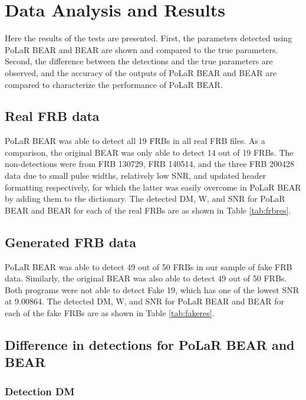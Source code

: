 \chapter{Data Analysis and Results}\label{result}

Here the results of the tests are presented. First, the parameters detected using PoLaR BEAR and BEAR are shown and compared to the true parameters. Second, the difference between the detections and the true parameters are observed, and the accuracy of the outputs of PoLaR BEAR and BEAR are compared to characterize the performance of PoLaR BEAR. 

\section{Real FRB data}

PoLaR BEAR was able to detect all 19 FRBs in all real FRB files. As a comparison, the original BEAR was only able to detect 14 out of 19 FRBs. The non-detections were from FRB 130729, FRB 140514, and the three FRB 200428 data due to small pulse widths, relatively low SNR, and updated header formatting respectively, for which the latter was easily overcome in PoLaR BEAR by adding them to the dictionary. The detected DM, W, and SNR for PoLaR BEAR and BEAR for each of the real FRBs are as shown in Table \ref{tab:frbres}.



\section{Generated FRB data}

PoLaR BEAR was able to detect 49 out of 50 FRBs in our sample of fake FRB data. Similarly, the original BEAR was also able to detect 49 out of 50 FRBs. Both programs were not able to detect Fake 19, which has one of the lowest SNR at 9.00864. The detected DM, W, and SNR for PoLaR BEAR and BEAR for each of the fake FRBs are as shown in Table \ref{tab:fakeres}.



\section{Difference in detections for PoLaR BEAR and BEAR}

\subsection{Detection DM}

